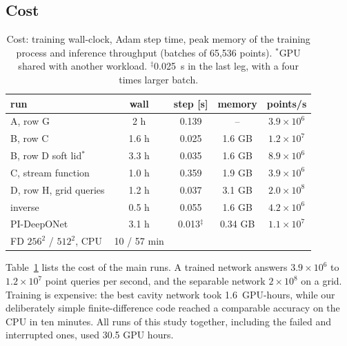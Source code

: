 \subsection{Cost}
\begin{table}[t]
\centering
\caption{Cost: training wall-clock, Adam step time, peak memory of the training process and inference
throughput (batches of 65,536 points). $^*$GPU shared with another workload. $^{\ddagger}$0.025~s in the last
leg, with a four times larger batch.}
\label{tab:cost}
\footnotesize
\setlength{\tabcolsep}{2.5pt}
\begin{tabular}{@{}lcccc@{}}
\toprule
run & wall & step [s] & memory & points/s\\
\midrule
A, row G & 2 h & 0.139 & -- & $3.9\times10^6$\\
B, row C & 1.6 h & 0.025 & 1.6 GB & $1.2\times10^7$\\
B, row D soft lid$^*$ & 3.3 h & 0.035 & 1.6 GB & $8.9\times10^6$\\
C, stream function & 1.0 h & 0.359 & 1.9 GB & $3.9\times10^6$\\
D, row H, grid queries & 1.2 h & 0.037 & 3.1 GB & $2.0\times10^8$\\
inverse & 0.5 h & 0.055 & 1.6 GB & $4.2\times10^6$\\
PI-DeepONet & 3.1 h & 0.013$^{\ddagger}$ & 0.34 GB & $1.1\times10^7$\\
\midrule
FD $256^2$ / $512^2$, CPU & 10 / 57 min & & & \\
\bottomrule
\end{tabular}
\end{table}
Table~\ref{tab:cost} lists the cost of the main runs. A trained network answers $3.9\times10^6$ to
$1.2\times10^7$ point queries per second, and the separable network $2\times10^8$ on a grid. Training is expensive: the best cavity network took
1.6~GPU-hours, while our deliberately simple finite-difference code reached a comparable accuracy on the CPU in ten
minutes. All runs of this study together, including the failed and interrupted ones, used 30.5 GPU hours.
